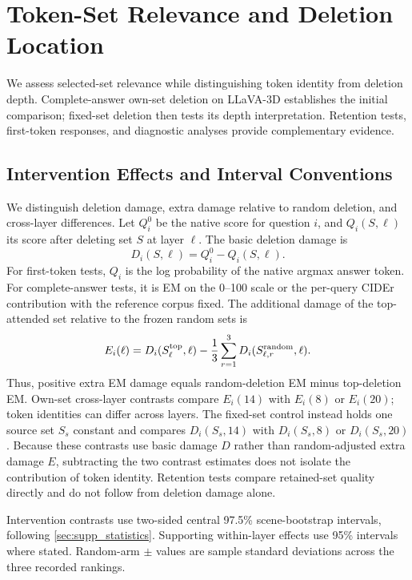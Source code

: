 \section{Token-Set Relevance and Deletion Location}
\label{sec:supp_functional}
We assess selected-set relevance while distinguishing token identity from deletion depth. Complete-answer own-set deletion on LLaVA-3D establishes the initial comparison; fixed-set deletion then tests its depth interpretation. Retention tests, first-token responses, and diagnostic analyses provide complementary evidence.


\subsection{Intervention Effects and Interval Conventions}
\label{sec:supp_damage}

We distinguish deletion damage, extra damage relative to random deletion, and cross-layer differences. Let $Q_i^0$ be the native score for question $i$, and $Q_i(S,\ell)$ its score after deleting set $S$ at layer $\ell$. The basic deletion damage is
\begin{equation}
D_i(S,\ell)=Q_i^0-Q_i(S,\ell).
\end{equation}
For first-token tests, $Q_i$ is the log probability of the native argmax answer token. For complete-answer tests, it is EM on the 0--100 scale or the per-query CIDEr contribution with the reference corpus fixed. The additional damage of the top-attended set relative to the frozen random sets is
\begin{equation}
E_i(\ell)=D_i(S_{\ell}^{\rm top},\ell)
-\frac{1}{3}\sum_{r=1}^{3}D_i(S_{\ell,r}^{\rm random},\ell).
\end{equation}
Thus, positive extra EM damage equals random-deletion EM minus top-deletion EM. Own-set cross-layer contrasts compare $E_i(14)$ with $E_i(8)$ or $E_i(20)$; token identities can differ across layers. The fixed-set control instead holds one source set $S_s$ constant and compares $D_i(S_s,14)$ with $D_i(S_s,8)$ or $D_i(S_s,20)$. Because these contrasts use basic damage $D$ rather than random-adjusted extra damage $E$, subtracting the two contrast estimates does not isolate the contribution of token identity. Retention tests compare retained-set quality directly and do not follow from deletion damage alone.

Intervention contrasts use two-sided central 97.5\% scene-bootstrap intervals, following \cref{sec:supp_statistics}. Supporting within-layer effects use 95\% intervals where stated. Random-arm $\pm$ values are sample standard deviations across the three recorded rankings.

